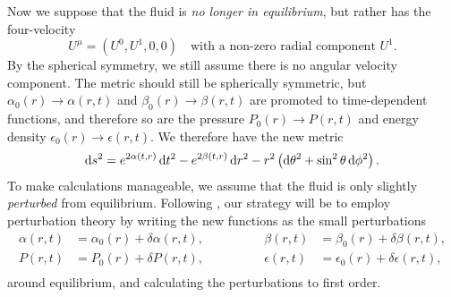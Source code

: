 Now we suppose that the fluid is \emph{no longer in equilibrium},  but rather has the four-velocity
\begin{equation}
	U^\mu = (U^0, U^1, 0, 0)
	\quad
	\text{with a non-zero radial component $U^1$.}
\label{eq:nstars:velocity_unstable}
\end{equation}
By the spherical symmetry, we still assume there is no angular velocity component.
The metric should still be spherically symmetric, but $\alpha_0(r) \rightarrow \alpha(r,t)$ and $\beta_0(r) \rightarrow \beta(r,t)$ are promoted to time-dependent functions, and therefore so are the pressure $P_0(r) \rightarrow P(r,t)$ and energy density $\epsilon_0(r) \rightarrow \epsilon(r,t)$.
We therefore have the new metric
\begin{equation}
	\mathop{}\!\mathrm{d} s^2 = e^{2 \alpha(t, r)} \mathop{}\!\mathrm{d} t^2 - e^{2 \beta(t, r)} \mathop{}\!\mathrm{d} r^2 - r^2 \left( \mathop{}\!\mathrm{d} \theta^2 + \sin^2 \theta \mathop{}\!\mathrm{d} \phi^2 \right) .
\label{eq:nstars:metric_unstable}
\end{equation}
To make calculations manageable, we assume that the fluid is only slightly \emph{perturbed} from equilibrium.
Following \cite{ref:chandrasekhar_stability}, our strategy will be to employ perturbation theory by writing the new functions as the small perturbations 
\begin{equation}
\begin{aligned}
	\alpha   (r, t) &= \alpha_0  (r) + \delta \alpha  (r, t), & \qquad \qquad
	\beta    (r, t) &= \beta_0   (r) + \delta \beta   (r, t), \\
	P        (r, t) &= P_0       (r) + \delta P       (r, t), & \qquad \qquad
	\epsilon (r, t) &= \epsilon_0(r) + \delta \epsilon(r, t), \\
\end{aligned}
\label{eq:nstars:perturbation_expansion}
\end{equation}
around equilibrium, and calculating the perturbations to first order.

